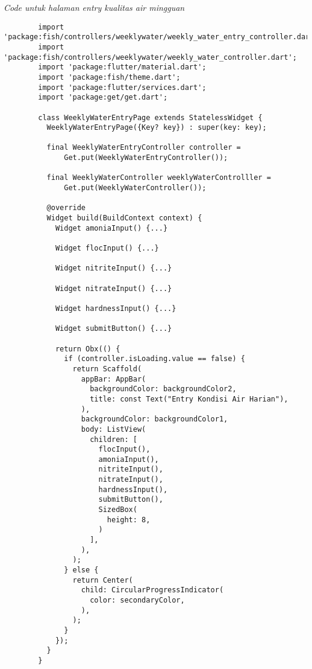 	\textit{Code untuk halaman entry kualitas air mingguan}
	\begin{lstlisting}
        import 'package:fish/controllers/weeklywater/weekly_water_entry_controller.dart';
        import 'package:fish/controllers/weeklywater/weekly_water_controller.dart';
        import 'package:flutter/material.dart';
        import 'package:fish/theme.dart';
        import 'package:flutter/services.dart';
        import 'package:get/get.dart';
        
        class WeeklyWaterEntryPage extends StatelessWidget {
          WeeklyWaterEntryPage({Key? key}) : super(key: key);
        
          final WeeklyWaterEntryController controller =
              Get.put(WeeklyWaterEntryController());
        
          final WeeklyWaterController weeklyWaterControlller =
              Get.put(WeeklyWaterController());
        
          @override
          Widget build(BuildContext context) {
            Widget amoniaInput() {...}
        
            Widget flocInput() {...}
        
            Widget nitriteInput() {...}
        
            Widget nitrateInput() {...}
        
            Widget hardnessInput() {...}
        
            Widget submitButton() {...}
        
            return Obx(() {
              if (controller.isLoading.value == false) {
                return Scaffold(
                  appBar: AppBar(
                    backgroundColor: backgroundColor2,
                    title: const Text("Entry Kondisi Air Harian"),
                  ),
                  backgroundColor: backgroundColor1,
                  body: ListView(
                    children: [
                      flocInput(),
                      amoniaInput(),
                      nitriteInput(),
                      nitrateInput(),
                      hardnessInput(),
                      submitButton(),
                      SizedBox(
                        height: 8,
                      )
                    ],
                  ),
                );
              } else {
                return Center(
                  child: CircularProgressIndicator(
                    color: secondaryColor,
                  ),
                );
              }
            });
          }
        }
        
	\end{lstlisting}

